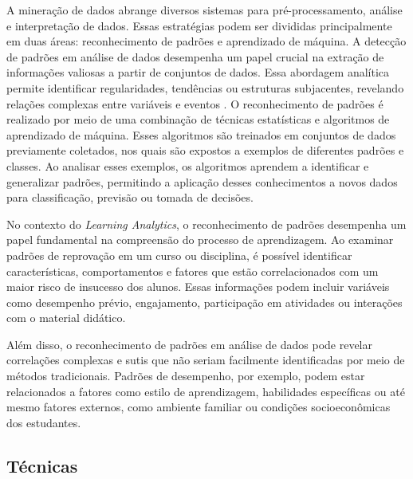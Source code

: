 A mineração de dados abrange diversos sistemas para pré-processamento, análise e interpretação de dados. Essas estratégias podem ser divididas principalmente em duas áreas: reconhecimento de padrões e aprendizado de máquina. %
A detecção de padrões em análise de dados desempenha um papel crucial na extração de informações valiosas a partir de conjuntos de dados. Essa abordagem analítica permite identificar regularidades, tendências ou estruturas subjacentes, revelando relações complexas entre variáveis e eventos \cite{Veluri2022}. O reconhecimento de padrões é realizado por meio de uma combinação de técnicas estatísticas e algoritmos de aprendizado de máquina. Esses algoritmos são treinados em conjuntos de dados previamente coletados, nos quais são expostos a exemplos de diferentes padrões e classes. Ao analisar esses exemplos, os algoritmos aprendem a identificar e generalizar padrões, permitindo a aplicação desses conhecimentos a novos dados para classificação, previsão ou tomada de decisões.

No contexto do \textit{Learning Analytics}, o reconhecimento de padrões desempenha um papel fundamental na compreensão do processo de aprendizagem. Ao examinar padrões de reprovação em um curso ou disciplina, é possível identificar características, comportamentos e fatores que estão correlacionados com um maior risco de insucesso dos alunos. Essas informações podem incluir variáveis como desempenho prévio, engajamento, participação em atividades ou interações com o material didático.

Além disso, o reconhecimento de padrões em análise de dados pode revelar correlações complexas e sutis que não seriam facilmente identificadas por meio de métodos tradicionais. Padrões de desempenho, por exemplo, podem estar relacionados a fatores como estilo de aprendizagem, habilidades específicas ou até mesmo fatores externos, como ambiente familiar ou condições socioeconômicas dos estudantes.

\subsection{Técnicas}

